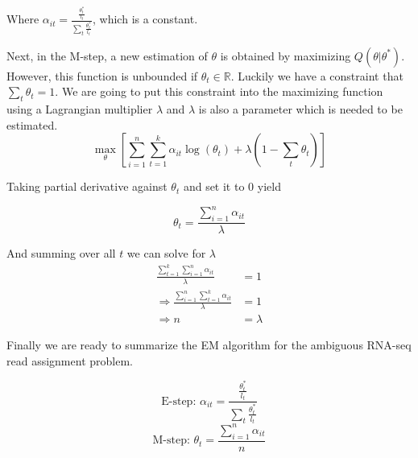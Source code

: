 \documentclass[12pt]{article}
\newcommand{\realR}{\mathbb{R}}
\begin{document}
Where $\alpha_{it} = \frac{\frac{\theta_t^*}{l_t}}{\sum_{t}\frac{\theta_t^*}{l_t}}$, which is a constant.

Next, in the M-step, a new estimation of $\theta$ is obtained by maximizing  $Q(\theta | \theta^*)$. However, this function is unbounded if $\theta_t \in \realR$. Luckily we have a constraint that $\sum_{t}\theta_t = 1$. We are going to put this constraint into the maximizing function using a Lagrangian multiplier $\lambda$ and $\lambda$ is also a parameter which is needed to be estimated. 
\begin{equation}
\max_{\theta}\left[ \sum_{i=1}^{n}\sum_{t=1}^{k} \alpha_{it}\log(\theta_t) + \lambda(1-\sum_{t}\theta_t) \right]
\end{equation}

Taking partial derivative against $\theta_t$ and set it to 0 yield 

\begin{equation}
\theta_t = \frac{\sum_{i=1}^{n}\alpha_{it}}{\lambda} 
\end{equation}

And summing over all $t$ we can solve for $\lambda$
\begin{align}
\frac{\sum_{t=1}^{k}\sum_{i=1}^{n}\alpha_{it}}{\lambda} & =1 \\
\Rightarrow \frac{\sum_{i=1}^{n} \sum_{t=1}^{k} \alpha_{it}}{\lambda} & =1 \\
\Rightarrow n & = \lambda
\end{align}

Finally we are ready to summarize the EM algorithm for the ambiguous RNA-seq read assignment problem. 

\begin{equation}
\mbox{E-step:    } \alpha_{it} = \frac{\frac{\theta_t^*}{l_t}}{\sum_{t}\frac{\theta_t^*}{l_t}} 
\end{equation}
\begin{equation}
\mbox{M-step:    } \theta_t = \frac{\sum_{i=1}^{n}\alpha_{it}}{n} 
\end{equation}
\end{document}
